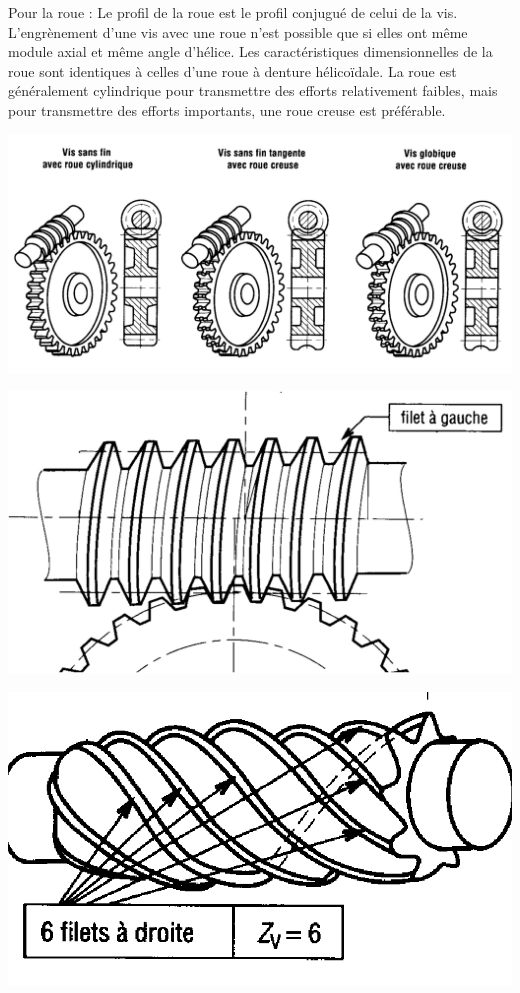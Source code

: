 \documentclass[11pt,oneside]{article}
\begin{document}
Pour la roue : 
Le profil de la roue est le profil conjugué de celui de la vis. L’engrènement d’une vis avec une roue n’est possible que si elles ont même module axial et même angle d’hélice. Les caractéristiques dimensionnelles de la roue sont identiques à celles d’une roue à denture hélicoïdale. La roue est généralement cylindrique pour transmettre des efforts relativement faibles, mais pour transmettre des efforts importants, une roue creuse est préférable.

\begin{center}
\includegraphics[width=.75\textwidth]{png/fig_76}
\end{center}


\begin{minipage}[c]{.45\linewidth}
\begin{center}
\includegraphics[width=.8\textwidth]{png/fig_77}
\end{center}
\end{minipage} \hfill
\begin{minipage}[c]{.45\linewidth}
\begin{center}
\includegraphics[width=.8\textwidth]{png/fig_78}
\end{center}
\end{minipage} \hfill
\end{document}
